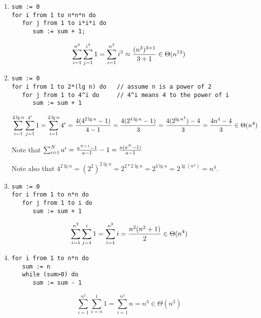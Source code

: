 \begin{enumerate}

\item 
\begin{verbatim}
sum := 0
for i from 1 to n*n*n do
   for j from 1 to i*i*i do
      sum := sum + 1;
\end{verbatim}

\begin{solution}
$$\sum_{i=1}^{n^3} \sum_{j=1}^{i^3} 1 
= \sum_{i=1}^{n^3} i^3 
\approx { (n^3)^{3+1} \over 3+1 }
\in \Theta(n^{12})$$
\end{solution}

\item 
\begin{verbatim}
sum := 0
for i from 1 to 2*(lg n) do   // assume n is a power of 2 
   for j from 1 to 4^i do     // 4^i means 4 to the power of i
      sum := sum + 1
\end{verbatim}

\begin{solution}
$$\sum_{i=1}^{2\lg n} \sum_{j=1}^{4^i} 1 
= \sum_{i=1}^{2\lg n} 4^i 
= {  4(4^{2\lg n} - 1)  \over  4-1 }
= {  4(2^{4\lg n} - 1)  \over 3}
= {  4(2^{\lg n^4}) - 4 \over 3}
= {  4n^4 - 4 \over 3}
\in \Theta(n^4)$$

Note that $\sum_{i=1}^{N} a^i = {a^{N+1} - 1 \over a-1} - 1 = { a(a^N -1) \over a-1}$

Note also that 
$4^{2\lg n} 
= (2^2)^{2\lg n}
= 2^{2*2\lg n} 
= 2^{4\lg n} 
= 2^{\lg( n^4 ) }
= n^4$.

\end{solution}

\item
\begin{verbatim}
sum := 0
for i from 1 to n*n do
   for j from 1 to i do
      sum := sum + 1
\end{verbatim}

\begin{solution}
$$\sum_{i=1}^{n^2} \sum_{j=1}^i 1 = \sum_{i=1}^{n^2} i = {n^2(n^2 + 1) \over 2} \in
\Theta(n^4)$$
\end{solution}

\item
\begin{verbatim}
for i from 1 to n*n do
   sum := n
   while (sum>0) do
      sum := sum - 1
\end{verbatim}


\begin{solution}
$$\sum_{i=1}^{n^2} \sum_{s=n}^1 1 = \sum_{i=1}^{n^2} n = n^3 \in \Theta(n^3)$$
\end{solution}


\end{enumerate}

